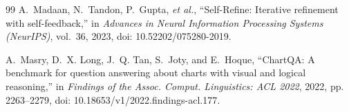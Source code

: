 \documentclass[conference]{IEEEtran}
\begin{document}
\begin{thebibliography}{99}
A.~Madaan, N.~Tandon, P.~Gupta, \emph{et al.}, ``Self-Refine: Iterative refinement with self-feedback,'' in \emph{Advances in Neural Information Processing Systems (NeurIPS)}, vol.~36, 2023, doi: 10.52202/075280-2019.

A.~Masry, D.~X. Long, J.~Q. Tan, S.~Joty, and E.~Hoque, ``ChartQA: A benchmark for question answering about charts with visual and logical reasoning,'' in \emph{Findings of the Assoc. Comput. Linguistics: ACL 2022}, 2022, pp. 2263--2279, doi: 10.18653/v1/2022.findings-acl.177.

\end{thebibliography}
\end{document}

